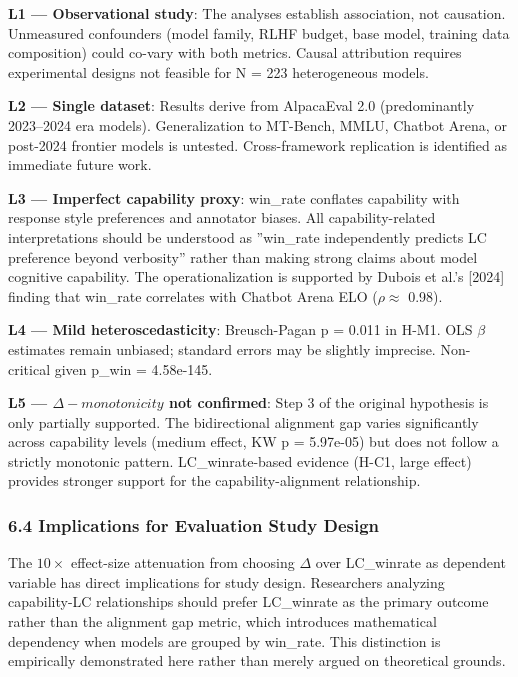 \textbf{L1 --- Observational study}: The analyses establish association, not causation. Unmeasured confounders (model family, RLHF budget, base model, training data composition) could co-vary with both metrics. Causal attribution requires experimental designs not feasible for N = 223 heterogeneous models.

\textbf{L2 --- Single dataset}: Results derive from AlpacaEval 2.0 (predominantly 2023--2024 era models). Generalization to MT-Bench, MMLU, Chatbot Arena, or post-2024 frontier models is untested. Cross-framework replication is identified as immediate future work.

\textbf{L3 --- Imperfect capability proxy}: win\_rate conflates capability with response style preferences and annotator biases. All capability-related interpretations should be understood as ''win\_rate independently predicts LC preference beyond verbosity'' rather than making strong claims about model cognitive capability. The operationalization is supported by Dubois et al.'s [2024] finding that win\_rate correlates with Chatbot Arena ELO ($\rho \approx$ 0.98).

\textbf{L4 --- Mild heteroscedasticity}: Breusch-Pagan p = 0.011 in H-M1. OLS $\beta$ estimates remain unbiased; standard errors may be slightly imprecise. Non-critical given p\_win = 4.58e-145.

\textbf{L5 --- $\Delta -monotonicity$ not confirmed}: Step 3 of the original hypothesis is only partially supported. The bidirectional alignment gap varies significantly across capability levels (medium effect, KW p = 5.97e-05) but does not follow a strictly monotonic pattern. LC\_winrate-based evidence (H-C1, large effect) provides stronger support for the capability-alignment relationship.

\subsubsection{6.4 Implications for Evaluation Study Design}

The $10\times$ effect-size attenuation from choosing $\Delta$ over LC\_winrate as dependent variable has direct implications for study design. Researchers analyzing capability-LC relationships should prefer LC\_winrate as the primary outcome rather than the alignment gap metric, which introduces mathematical dependency when models are grouped by win\_rate. This distinction is empirically demonstrated here rather than merely argued on theoretical grounds.

